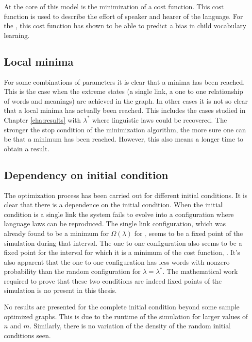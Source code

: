 At the core of this model is the minimization of a cost function.
This cost function is used to describe the effort of speaker and hearer of the language.
For the \firstmodel{}, this cost function has shown to be able to predict a bias in child vocabulary learning. \cite{Ferrer2017a} \cite{Carrera2021a}

\subsection{Local minima}
\label{sec:discussion_comp_minima}

For some combinations of parameters it is clear that a minima has been reached.
This is the case when the extreme states (a single link, a one to one relationship of words and meanings) are achieved in the graph.
In other cases it is not so clear that a local minima has actually been reached.
This includes the cases studied in Chapter \ref{cha:results} with $\lambda^*$ where linguistic laws could be recovered.
The stronger the stop condition of the minimization algorithm, the more sure one can be that a minimum has been reached.
However, this also means a longer time to obtain a result.

\subsection{Dependency on initial condition}
\label{sec:discussion_comp_initial-condition}

The optimization process has been carried out for different initial conditions.
It is clear that there is a dependence on the initial condition.
When the initial condition is a single link the system fails to evolve into a configuration where language laws can be reproduced.
The single link configuration, which was already found to be a minimum for $\Omega(\lambda)$ for \lambdaZeroToHalf{}, seems to be a fixed point of the simulation during that interval.
The one to one configuration also seems to be a fixed point for the interval for which it is a minimum of the cost function, \lambdaHalfToOne{}.
It's also apparent that the one to one configuration has less words with nonzero probability than the random configuration for $\lambda=\lambda^*$.
The mathematical work required to prove that these two conditions are indeed fixed points of the simulation is no present in this thesis.

No results are presented for the complete initial condition beyond some sample optimized graphs.
This is due to the runtime of the simulation for larger values of $n$ and $m$.
Similarly, there is no variation of the density of the random initial conditions seen.

